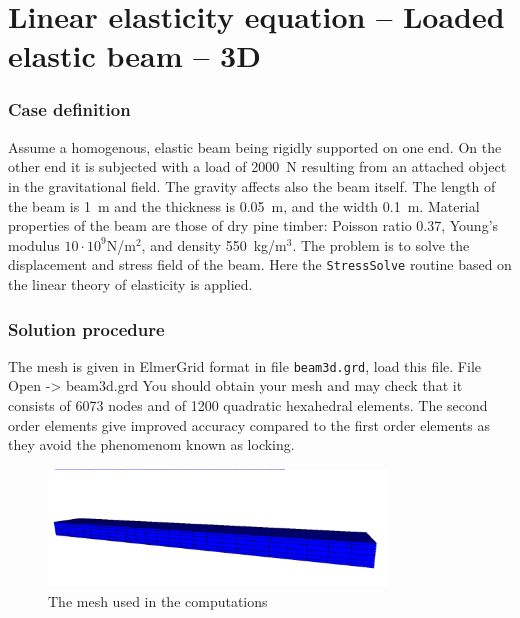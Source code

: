 \chapter{Linear elasticity equation -- Loaded elastic beam -- 3D}



\subsection*{Case definition}

Assume a homogenous, elastic beam being rigidly supported on one 
end. On the other end it is subjected with a load of 2000~N
resulting from an attached object in the gravitational field. The gravity affects also the beam itself.
The length of the beam is 1~m and the thickness is 0.05~m, and the width 
0.1~m.
Material properties of the beam are those of dry pine timber:
Poisson 
ratio 0.37, Young's modulus $10\cdot 10^9$N/m$^2$, and density 550~kg/m$^3$. 
The problem is to solve the displacement and stress field of the beam.  
Here the \texttt{StressSolve} routine based on the 
linear theory of elasticity is applied.


\subsection*{Solution procedure}

The mesh is given in ElmerGrid format in file \texttt{beam3d.grd}, load this file.
\ttbegin
File 
  Open -> beam3d.grd
\ttend
You should obtain your mesh and may check that it consists of 6073 nodes and of 
1200 quadratic hexahedral elements. The second order elements give
improved accuracy compared to the first order elements as they avoid the phenomenom known as locking.
\begin{figure}[h!]
\begin{center}
  \includegraphics[width=0.8\textwidth,viewport=0 0 1230 300,clip]{beam_mesh}
  \caption{The mesh used in the computations}
  \label{fig:elast_mesh}
\end{center}
\end{figure}


